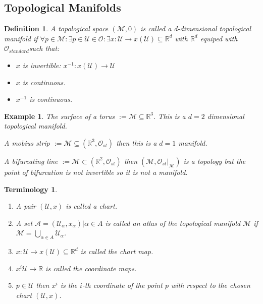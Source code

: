 \documentclass[10pt, oneside]{article}
\newcommand{\R}{\mathbb{R}}
\newcommand{\M}{\mathcal{M}}
\newtheorem{defn}{Definition}
\newtheorem{example}{Example}
\newtheorem{Terminology}{Terminology}
\begin{document}
     \subsection*{Topological Manifolds}
        \begin{defn}
           A topological space $(\M, \mathcal{0})$ is called a d-dimensional topological manifold if $\forall p \in \M: \exists p \in \mathcal{U} \in \mathcal{O} : \exists x:\mathcal{U} \to x(\mathcal{U}) \subseteq \R^d$ with $\R^d$ equiped with $\mathcal{O}_{standard}$such that:
           \begin{itemize}
              \item $x$ is invertible: $x^{-1}: x(\mathcal{U}) \to \mathcal{U}$
              \item $x$ is continuous.
              \item $x^{-1}$ is continuous.
           \end{itemize}
        \end{defn}
        \begin{example}
           \item The surface of a torus $:= \M \subseteq \R^3$. This is a $d=2$ dimensional topological manifold.
           \item A mobius strip $:= \M \subseteq (\R^3,\mathcal{O}_{st})$ then this is a $d=1$ manifold.
           \item A bifurcating line $:= \M \subset (\R^2,\mathcal{O}_{st})$ then $(\M, \mathcal{O}_{st}|_{\M})$ is a topology but the point of bifurcation is not invertible so it is not a manifold.
        \end{example}
        \begin{Terminology}
           \begin{enumerate}
              \item A pair $(\mathcal{U},x)$ is called a chart.
              \item A set $\mathcal{A}={(\mathcal{U_\alpha},x_{\alpha})|\alpha \in A}$ is called an atlas of the topological manifold $\M$ if $\mathcal{M} = \bigcup_{\alpha \in A} \mathcal{U}_\alpha$.
              \item $x:\mathcal{U} \to x(\mathcal{U}) \subseteq \R^d$ is called the chart map.
              \item $x^{i} \mathcal{U} \to \R$ is called the coordinate maps.
              \item $p \in \mathcal{U}$ then $x^{i}$ is the $i$-th coordinate of the point $p$ with respect to the chosen chart $(\mathcal{U},x)$.
           \end{enumerate}
        \end{Terminology}
\end{document}
